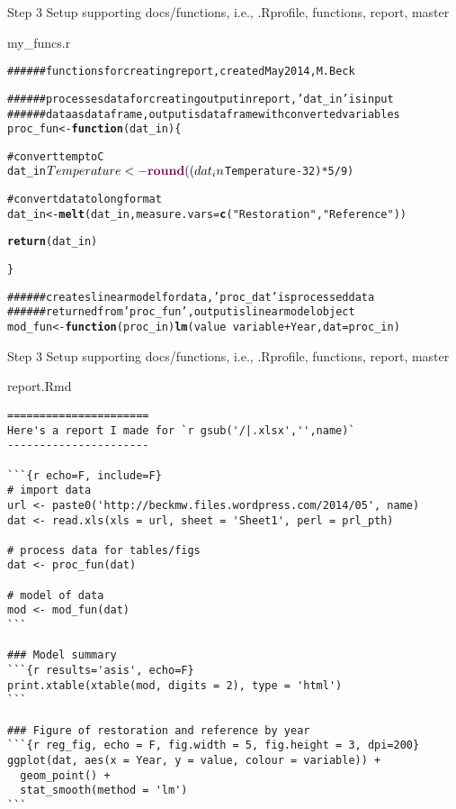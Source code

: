 \documentclass[xcolor=svgnames]{beamer}\usepackage{graphicx, color}
\makeatletter
\newcommand{\hlfunctioncall}[1]{\textcolor[rgb]{0.501960784313725,0,0.329411764705882}{\textbf{#1}}}%
\newcommand{\hlstring}[1]{\textcolor[rgb]{0.6,0.6,1}{#1}}%
\newcommand{\hlcomment}[1]{\textcolor[rgb]{0.180392156862745,0.6,0.341176470588235}{#1}}%
\newenvironment{kframe}{%
 \def\at@end@of@kframe{}%
 \ifinner\ifhmode%
  \def\at@end@of@kframe{\end{minipage}}%
  \begin{minipage}{\columnwidth}%
 \fi\fi%
 \def\FrameCommand##1{\hskip\@totalleftmargin \hskip-\fboxsep
 \colorbox{shadecolor}{##1}\hskip-\fboxsep
     \hskip-\linewidth \hskip-\@totalleftmargin \hskip\columnwidth}%
 \MakeFramed {\advance\hsize-\width
   \@totalleftmargin\z@ \linewidth\hsize
   \@setminipage}}%
 {\par\unskip\endMakeFramed%
 \at@end@of@kframe}
\newenvironment{knitrout}{}{} %
\makeatother
\begin{document}
\begin{frame}[t, fragile]{Step 3}
Setup supporting docs/functions, i.e., .Rprofile, functions, report, master
\scriptsize
\begin{block}{my\_funcs.r}
\begin{knitrout}
\color{fgcolor}\begin{kframe}
\begin{alltt}
\hlcomment{###### functions for creating report, created May 2014, M. Beck}

\hlcomment{###### processes data for creating output in report, 'dat_in' is input}
\hlcomment{###### data as data frame, output is data frame with converted variables}
proc_fun <- \hlfunctioncall{function}(dat_in) \{
    
\hlcomment{    # convert temp to C}
    dat_in$Temperature <- \hlfunctioncall{round}((dat_in$Temperature - 32) * 5/9)
    
\hlcomment{    # convert data to long format}
    dat_in <- \hlfunctioncall{melt}(dat_in, measure.vars = \hlfunctioncall{c}(\hlstring{"Restoration"}, \hlstring{"Reference"}))
    
    \hlfunctioncall{return}(dat_in)
    
\}

\hlcomment{###### creates linear model for data, 'proc_dat' is processed data}
\hlcomment{###### returned from 'proc_fun', output is linear model object}
mod_fun <- \hlfunctioncall{function}(proc_in) \hlfunctioncall{lm}(value ~ variable + Year, dat = proc_in)
\end{alltt}
\end{kframe}
\end{knitrout}

\end{block}
\end{frame}

\begin{frame}{Step 3}
Setup supporting docs/functions, i.e., .Rprofile, functions, report, master
\scriptsize
\begin{block}{report.Rmd}
\begin{verbatim}
======================
Here's a report I made for `r gsub('/|.xlsx','',name)`
----------------------

```{r echo=F, include=F}  
# import data
url <- paste0('http://beckmw.files.wordpress.com/2014/05', name)
dat <- read.xls(xls = url, sheet = 'Sheet1', perl = prl_pth)

# process data for tables/figs
dat <- proc_fun(dat)

# model of data
mod <- mod_fun(dat)
```

### Model summary
```{r results='asis', echo=F}
print.xtable(xtable(mod, digits = 2), type = 'html')
```

### Figure of restoration and reference by year
```{r reg_fig, echo = F, fig.width = 5, fig.height = 3, dpi=200}
ggplot(dat, aes(x = Year, y = value, colour = variable)) + 
  geom_point() +
  stat_smooth(method = 'lm')
```
\end{verbatim}
\end{block}
\end{frame}
\end{document}
